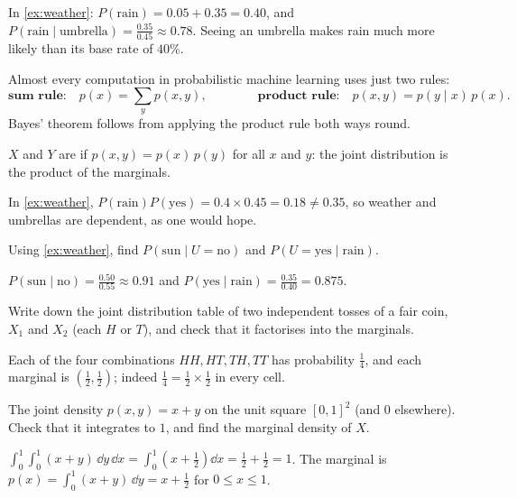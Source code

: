 In \cref{ex:weather}: $P(\text{rain}) = 0.05 + 0.35 = 0.40$, and
$P(\text{rain} \mid \text{umbrella}) = \frac{0.35}{0.45} \approx 0.78$. Seeing an
umbrella makes rain much more likely than its base rate of $40\%$.

\begin{keytakeaways}
Almost every computation in probabilistic machine learning uses just two rules:
\[
  \textbf{sum rule:}\quad p(x) = \sum_y p(x, y),
  \qquad\qquad
  \textbf{product rule:}\quad p(x, y) = p(y \mid x)\,p(x).
\]
Bayes' theorem follows from applying the product rule both ways round.
\end{keytakeaways}

\begin{definition}\label{def:independent-rv}
$X$ and $Y$ are  if
$p(x, y) = p(x)\,p(y)$ for all $x$ and $y$: the joint distribution is the product
of the marginals.
\end{definition}

In \cref{ex:weather}, $P(\text{rain})P(\text{yes}) = 0.4\times0.45 = 0.18 \neq 0.35$,
so weather and umbrellas are dependent, as one would hope.

\sectionexercises

\begin{exercise}
Using \cref{ex:weather}, find $P(\text{sun} \mid U = \text{no})$ and
$P(U = \text{yes} \mid \text{rain})$.
\end{exercise}
\begin{solution}
$P(\text{sun} \mid \text{no}) = \tfrac{0.50}{0.55} \approx 0.91$ and
$P(\text{yes} \mid \text{rain}) = \tfrac{0.35}{0.40} = 0.875$.
\end{solution}

\begin{exercise}
Write down the joint distribution table of two independent tosses of a fair coin,
$X_1$ and $X_2$ (each $H$ or $T$), and check that it factorises into the marginals.
\end{exercise}
\begin{solution}
Each of the four combinations $HH, HT, TH, TT$ has probability $\tfrac14$, and each
marginal is $\left(\tfrac12, \tfrac12\right)$; indeed $\tfrac14 =
\tfrac12\times\tfrac12$ in every cell.
\end{solution}

\begin{exercise}
The joint density $p(x, y) = x + y$ on the unit square $[0, 1]^2$ (and $0$
elsewhere). Check that it integrates to $1$, and find the marginal density of $X$.
\end{exercise}
\begin{solution}
$\int_0^1\!\int_0^1(x + y)\,\dd y\,\dd x = \int_0^1\left(x + \tfrac12\right)\dd x
= \tfrac12 + \tfrac12 = 1$. The marginal is
$p(x) = \int_0^1(x + y)\,\dd y = x + \tfrac12$ for $0 \le x \le 1$.
\end{solution}

